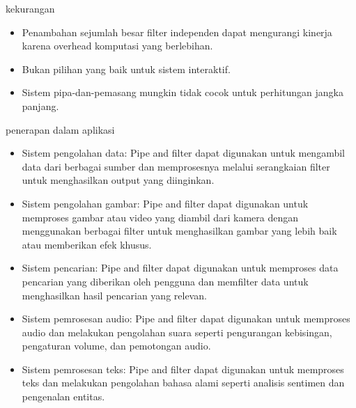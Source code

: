 \documentclass[aspectratio=169, table]{beamer}
\begin{document}
    \begin{frame}{kekurangan}
        \begin{itemize}
            \item 	Penambahan sejumlah besar filter independen dapat mengurangi kinerja karena overhead komputasi yang berlebihan.
            \item Bukan pilihan yang baik untuk sistem interaktif.
            \item Sistem pipa-dan-pemasang mungkin tidak cocok untuk perhitungan jangka panjang.
        \end{itemize}

    \end{frame}
    \begin{frame}{penerapan dalam aplikasi}
        \begin{itemize}
            \item Sistem pengolahan data: Pipe and filter dapat digunakan untuk mengambil data dari berbagai sumber dan memprosesnya melalui serangkaian filter untuk menghasilkan output yang diinginkan.

            \item Sistem pengolahan gambar: Pipe and filter dapat digunakan untuk memproses gambar atau video yang diambil dari kamera dengan menggunakan berbagai filter untuk menghasilkan gambar yang lebih baik atau memberikan efek khusus.

            \item Sistem pencarian: Pipe and filter dapat digunakan untuk memproses data pencarian yang diberikan oleh pengguna dan memfilter data untuk menghasilkan hasil pencarian yang relevan.

            \item Sistem pemrosesan audio: Pipe and filter dapat digunakan untuk memproses audio dan melakukan pengolahan suara seperti pengurangan kebisingan, pengaturan volume, dan pemotongan audio.

            \item Sistem pemrosesan teks: Pipe and filter dapat digunakan untuk memproses teks dan melakukan pengolahan bahasa alami seperti analisis sentimen dan pengenalan entitas.
        \end{itemize}
    \end{frame}
\end{document}
